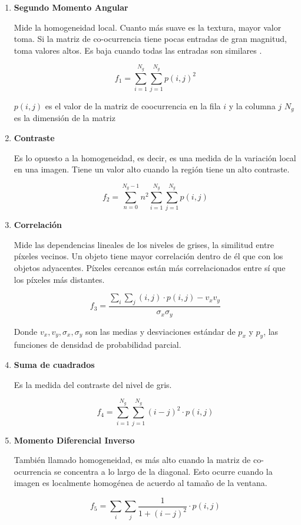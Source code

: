 \begin{enumerate}

\item \textbf{Segundo Momento Angular}

Mide la homogeneidad local. Cuanto más suave es la textura, mayor valor toma. Si la matriz de co-ocurrencia tiene pocas entradas de gran magnitud, toma valores altos. Es baja cuando todas las entradas son similares \cite{waveletdiscreta}.

\[f_1 = \sum_{i=1}^{N_g}\sum_{j=1}^{N_g} p(i,j)^2\]

$p(i,j)$ es el valor de la matriz de coocurrencia en la fila $i$ y la columna $j$
$N_g$ es la dimensión de la matriz

\item \textbf{Contraste}

Es lo opuesto a la homogeneidad, es decir, es una medida de la variación local en una imagen. Tiene un valor alto cuando la región tiene un alto contraste.

\[f_2 =\sum_{n=0}^{N_g-1}n^2 \sum_{i=1}^{N_g}\sum_{j=1}^{N_g} p(i,j)\]

\item \textbf{Correlación}

Mide las dependencias lineales de los niveles de grises, la similitud entre píxeles vecinos. Un objeto tiene mayor correlación dentro de él que con los objetos adyacentes. Píxeles cercanos están más correlacionados entre sí que los píxeles más distantes.

\[f_3 = \frac{\sum_i \sum_j (i,j)\cdot p(i,j) - v_xv_y}{\sigma_x\sigma_y}\]

Donde $v_x, v_y, \sigma_x, \sigma_y$ son las medias y desviaciones estándar de $p_x$ y $p_y$, las funciones de densidad de probabilidad parcial.

\item \textbf{Suma de cuadrados}

Es la medida del contraste del nivel de gris.

\[f_4 = \sum_{i=1}^{N_g}\sum_{j=1}^{N_g}(i-j)^2\cdot p(i,j)\]

\item \textbf{Momento Diferencial Inverso}

También llamado homogeneidad, es más alto cuando la matriz de co-ocurrencia se concentra a lo largo de la diagonal. Esto ocurre cuando la imagen es localmente homogénea de acuerdo al tamaño de la ventana.

\[f_5 = \sum_{i}\sum_{j}\frac{1}{1+(i-j)^2}\cdot p(i,j)\]


\end{enumerate}
